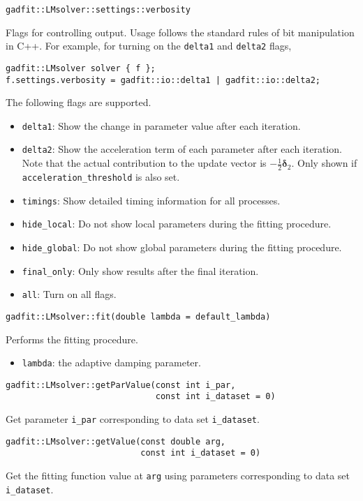 \documentclass{article}
\begin{document}
\begin{verbatim}
gadfit::LMsolver::settings::verbosity
\end{verbatim}
Flags for controlling output. Usage follows the standard rules of bit manipulation in C++. For example, for turning on the \verb+delta1+ and \verb+delta2+ flags,
\begin{verbatim}
gadfit::LMsolver solver { f };
f.settings.verbosity = gadfit::io::delta1 | gadfit::io::delta2;
\end{verbatim}
The following flags are supported.
\begin{itemize}
\item \verb+delta1+: Show the change in parameter value after each iteration.
\item \verb+delta2+: Show the acceleration term of each parameter after each iteration. Note that the actual contribution to the update vector is $-\frac{1}{2}\bm\delta_2$. Only shown if \verb+acceleration_threshold+ is also set.
\item \verb+timings+: Show detailed timing information for all processes.
\item \verb+hide_local+: Do not show local parameters during the fitting procedure.
\item \verb+hide_global+: Do not show global parameters during the fitting procedure.
\item \verb+final_only+: Only show results after the final iteration.
\item \verb+all+: Turn on all flags.
\end{itemize}

\begin{verbatim}
gadfit::LMsolver::fit(double lambda = default_lambda)
\end{verbatim}
Performs the fitting procedure.
\begin{itemize}
\item \verb+lambda+: the adaptive damping parameter.
\end{itemize}

\begin{verbatim}
gadfit::LMsolver::getParValue(const int i_par,
                              const int i_dataset = 0)
\end{verbatim}
Get parameter \verb+i_par+ corresponding to data set \verb+i_dataset+.

\begin{verbatim}
gadfit::LMsolver::getValue(const double arg,
                           const int i_dataset = 0)
\end{verbatim}
Get the fitting function value at \texttt{arg} using parameters corresponding to data set \verb+i_dataset+.
\end{document}
